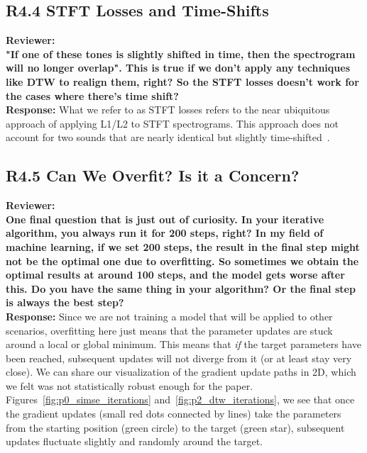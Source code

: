 \documentclass[11pt]{article}
\begin{document}
\subsection{\textbf{R4.4} STFT Losses and Time-Shifts}
\noindent\textbf{Reviewer:}\\
\textbf{"If one of these tones is slightly shifted in time, then the spectrogram will no longer overlap". This is true if we don't apply any techniques like DTW to realign them, right?
So the STFT losses doesn't work for the cases where there's time shift?}
\\

\noindent\textbf{Response:}
What we refer to as STFT losses refers to the near ubiquitous approach of applying L1/L2 to STFT spectrograms. This approach does not account for two sounds that are nearly identical but slightly time-shifted~\cite{vahidi2023mesostructures,turian2020sorry}.

\subsection{\textbf{R4.5} Can We Overfit? Is it a Concern?}
\noindent\textbf{Reviewer:}\\
\textbf{One final question that is just out of curiosity.
In your iterative algorithm, you always run it for 200 steps, right?
In my field of machine learning, if we set 200 steps, the result in the final step might not be the optimal one due to overfitting. So sometimes we obtain the optimal results at around 100 steps, and the model gets worse after this.
Do you have the same thing in your algorithm? Or the final step is always the best step?
}
\\

\noindent\textbf{Response:} 
Since we are not training a model that will be applied to other scenarios, overfitting here just means that the parameter updates are stuck around a local or global minimum. This means that \textit{if} the target parameters have been reached, subsequent updates will not diverge from it (or at least stay very close). We can share our visualization of the gradient update paths in 2D, which we felt was not statistically robust enough for the paper. Figures~\ref{fig:p0_simse_iterations} and~\ref{fig:p2_dtw_iterations}, we see that once the gradient updates (small red dots connected by lines) take the parameters from the starting position (green circle) to the target (green star), subsequent updates fluctuate slightly and randomly around the target. 
\end{document}
